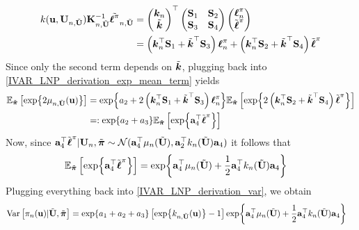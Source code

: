 \documentclass[12pt]{article}
\begin{document}
\begin{align*}
\logUnPostKer(\bpar, \designMat[\designIdx, \batchMat]) \KerMat[\designIdx, \batchMat]^{-1} \tilde{\logUnPostObs[]}_{\designIdx, \batchMat}
&= \begin{pmatrix} \boldsymbol{\logUnPostKer}_{\designIdx} \\ \tilde{\boldsymbol{\logUnPostKer}}  \end{pmatrix}^\top 
\begin{pmatrix} \bS_{1} & \bS_{2} \\  \bS_{3} & \bS_{4} \end{pmatrix} 
\begin{pmatrix} \logUnPostObs \\ \logUnPostBatch \end{pmatrix} \\
&= \left(\boldsymbol{\logUnPostKer}_{\designIdx}^\top \bS_1 + \tilde{\boldsymbol{\logUnPostKer}}^\top \bS_3 \right) \logUnPostObs + 
\left(\boldsymbol{\logUnPostKer}_{\designIdx}^\top \bS_2 + \tilde{\boldsymbol{\logUnPostKer}}^\top \bS_4 \right) \logUnPostBatch
\end{align*}
Since only the second term depends on $\tilde{\boldsymbol{\logUnPostKer}}$, plugging back into \ref{IVAR_LNP_derivation_exp_mean_term} yields 
\begin{align*}
\E_{\tilde{\boldsymbol{\postDens}}}\left[\Exp{2 \logUnPostMeanPred[\designIdx, \batchMat](\bpar)} \right] 
&= \Exp{a_2 + 
2\left(\boldsymbol{\logUnPostKer}_{\designIdx}^\top \bS_1 + \tilde{\boldsymbol{\logUnPostKer}}^\top \bS_3 \right) \logUnPostObs }
\E_{\tilde{\boldsymbol{\postDens}}}\left[\Exp{2\left(\boldsymbol{\logUnPostKer}_{\designIdx}^\top \bS_2 + \tilde{\boldsymbol{\logUnPostKer}}^\top \bS_4 \right) \logUnPostBatch}\right] \\
&=: \Exp{a_2 + a_3} \E_{\tilde{\boldsymbol{\postDens}}}\left[\Exp{\ba_4^\top \logUnPostBatch} \right]
\end{align*}
Now, since 
$\ba_4^\top \logUnPostBatch | \designMat, \tilde{\boldsymbol{\postDens}} \sim 
\Gaussian(\ba_4^\top \logUnPostMeanPred(\batchMat), \ba_2^\top \logUnPostKerPred(\batchMat) \ba_4)$ 
it follows that 
\begin{align*}
\E_{\tilde{\boldsymbol{\postDens}}}\left[\Exp{\ba_4^\top \logUnPostBatch} \right]
&= \Exp{\ba_4^\top \logUnPostMeanPred(\batchMat) + \frac{1}{2} \ba_4^\top \logUnPostKerPred(\batchMat) \ba_4}
\end{align*}
Plugging everything back into \ref{IVAR_LNP_derivation_var}, we obtain 
\begin{align}
\Var\left[\unPostPred(\bpar) | \batchMat, \tilde{\boldsymbol{\postDens}} \right] &= \Exp{a_1 + a_2 + a_3}  \left[\Exp{\logUnPostKerPred[\designIdx, \batchMat](\bpar)} - 1\right] \Exp{\ba_4^\top \logUnPostMeanPred(\batchMat) + \frac{1}{2} \ba_4^\top \logUnPostKerPred(\batchMat) \ba_4}
\end{align}
\end{document}
